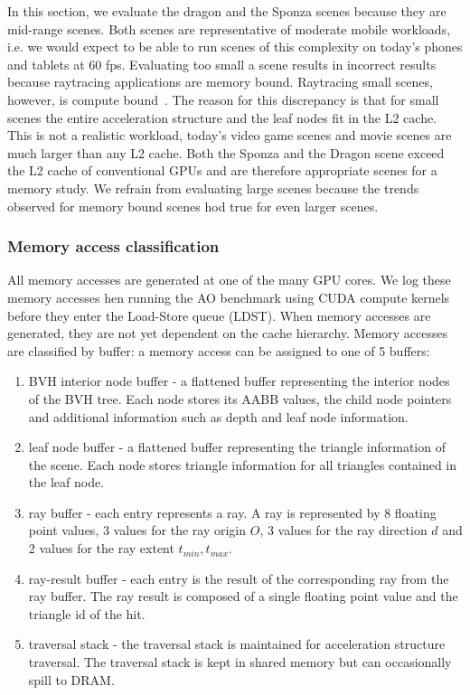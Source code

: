 In this section, we evaluate the dragon and the Sponza scenes because they are mid-range scenes. Both scenes are representative of moderate mobile workloads, i.e. we would expect to be able to run scenes of this complexity on today's phones and tablets at 60 fps. 
Evaluating too small a scene results in incorrect results because raytracing applications are memory bound. Raytracing small scenes, however, is compute bound~\cite{Aila:2010:ACT:1921479.1921497}. The reason for this discrepancy is that for small scenes the entire acceleration structure and the leaf nodes fit in the L2 cache. This is not a realistic workload, today's video game scenes and movie scenes are much larger than any L2 cache. Both the Sponza and the Dragon scene exceed the L2 cache of conventional GPUs and are therefore appropriate scenes for a memory study.
We refrain from evaluating large scenes because the trends observed for memory bound scenes hod true for even larger scenes.

\subsubsection{Memory access classification}
\label{subsec:mem_classification}

All memory accesses are generated at one of the many GPU cores.
We log these memory accesses hen running the AO benchmark using CUDA compute kernels before they enter the Load-Store queue (LDST). When memory accesses are generated, they are not yet dependent on the cache hierarchy. 
Memory accesses are classified by buffer: a memory access can be assigned to one of 5 buffers:

\begin{enumerate}
   \item BVH interior node buffer - a flattened buffer representing the interior nodes of the BVH tree. Each node stores its AABB values, the child node pointers and additional information such as depth and leaf node information.
   \item leaf node buffer - a flattened buffer representing the triangle information of the scene. Each node stores triangle information for all triangles contained in the leaf node. 
   \item ray buffer - each entry represents a ray. A ray is represented by 8 floating point values, 3 values for the ray origin $O$, 3 values for the ray direction $d$ and 2 values for the ray extent $t_{min}, t_{max}$. 
   \item ray-result buffer - each entry is the result of the corresponding ray from the ray buffer. The ray result is composed of a single floating point value and the triangle id of the hit. 
   \item traversal stack - the traversal stack is maintained for acceleration structure traversal. The traversal stack is kept in shared memory but can occasionally spill to DRAM.
\end{enumerate}

